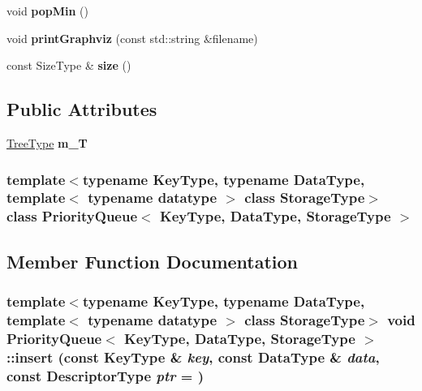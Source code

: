 \begin{DoxyCompactItemize}
\item 
\hypertarget{class_priority_queue_a1554c9f244831aaa21bfca2afb70602c}{
void {\bfseries popMin} ()}
\label{class_priority_queue_a1554c9f244831aaa21bfca2afb70602c}

\item 
\hypertarget{class_priority_queue_ae801a98111fca7d5a251c36bc4192755}{
void {\bfseries printGraphviz} (const std::string \&filename)}
\label{class_priority_queue_ae801a98111fca7d5a251c36bc4192755}

\item 
\hypertarget{class_priority_queue_a57ef08de2b59e1a5a52fde74c64d8060}{
const SizeType \& {\bfseries size} ()}
\label{class_priority_queue_a57ef08de2b59e1a5a52fde74c64d8060}

\end{DoxyCompactItemize}
\subsection*{Public Attributes}
\begin{DoxyCompactItemize}
\item 
\hypertarget{class_priority_queue_a5ed0dac8f4df5cf00cc80084958d5fba}{
\hyperlink{class_complete_binary_tree}{TreeType} {\bfseries m\_\-T}}
\label{class_priority_queue_a5ed0dac8f4df5cf00cc80084958d5fba}

\end{DoxyCompactItemize}
\subsubsection*{template$<$typename KeyType, typename DataType, template$<$ typename datatype $>$ class StorageType$>$ class PriorityQueue$<$ KeyType, DataType, StorageType $>$}



\subsection{Member Function Documentation}
\hypertarget{class_priority_queue_aa8e6289ad1b0f220efe2451644922bf0}{
\subsubsection[{insert}]{\setlength{\rightskip}{0pt plus 5cm}template$<$typename KeyType, typename DataType, template$<$ typename datatype $>$ class StorageType$>$ void {\bf PriorityQueue}$<$ KeyType, DataType, StorageType $>$::insert (const KeyType \& {\em key}, \/  const DataType \& {\em data}, \/  const DescriptorType {\em ptr} = {})}}
\label{class_priority_queue_aa8e6289ad1b0f220efe2451644922bf0}


